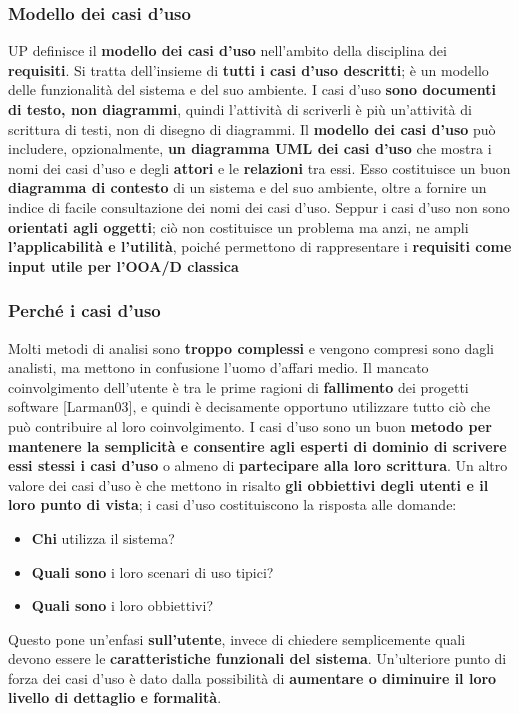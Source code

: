 \documentclass[12pt]{article}
\begin{document}
\subsubsection{Modello dei casi d'uso}
UP definisce il \textbf{modello dei casi d'uso} nell'ambito della disciplina dei \textbf{requisiti}.
Si tratta dell'insieme di \textbf{tutti i casi d'uso descritti}; è un modello delle funzionalità del sistema e del suo ambiente.
I casi d'uso \textbf{sono documenti di testo, non diagrammi}, quindi l'attività di scriverli è più un'attività di scrittura di testi, non di disegno di diagrammi.
Il \textbf{modello dei casi d'uso} può includere, opzionalmente, \textbf{un diagramma UML dei casi d'uso} che mostra i nomi dei casi d'uso e degli \textbf{attori} e le \textbf{relazioni} tra essi.
Esso costituisce un buon \textbf{diagramma di contesto} di un sistema e del suo ambiente, oltre a fornire un indice di facile consultazione dei nomi dei casi d'uso.
Seppur i casi d'uso non sono \textbf{orientati agli oggetti}; ciò non costituisce un problema ma anzi, ne ampli \textbf{l'applicabilità e l'utilità}, poiché permettono di rappresentare i \textbf{requisiti come input utile per l'OOA/D classica}
\subsubsection{Perché i casi d'uso}
Molti metodi di analisi sono \textbf{troppo complessi} e vengono compresi sono dagli analisti, ma mettono in confusione l'uomo d'affari medio.
Il mancato coinvolgimento dell'utente è tra le prime ragioni di \textbf{fallimento} dei progetti software [Larman03], e quindi è decisamente opportuno utilizzare tutto ciò che può contribuire al loro coinvolgimento.
I casi d'uso sono un buon \textbf{metodo per mantenere la semplicità e consentire agli esperti di dominio di scrivere essi stessi i casi d'uso} o almeno di \textbf{partecipare alla loro scrittura}.
Un altro valore dei casi d'uso è che mettono in risalto \textbf{gli obbiettivi degli utenti e il loro punto di vista}; i casi d'uso costituiscono la risposta alle domande:
\begin{itemize}
    \item \textbf{Chi} utilizza il sistema?
    \item \textbf{Quali sono} i loro scenari di uso tipici?
    \item \textbf{Quali sono} i loro obbiettivi?
\end{itemize}
Questo pone un'enfasi \textbf{sull'utente}, invece di chiedere semplicemente quali devono essere le \textbf{caratteristiche funzionali del sistema}.
Un'ulteriore punto di forza dei casi d'uso è dato dalla possibilità di \textbf{aumentare o diminuire il loro livello di dettaglio e formalità}.
\end{document}
